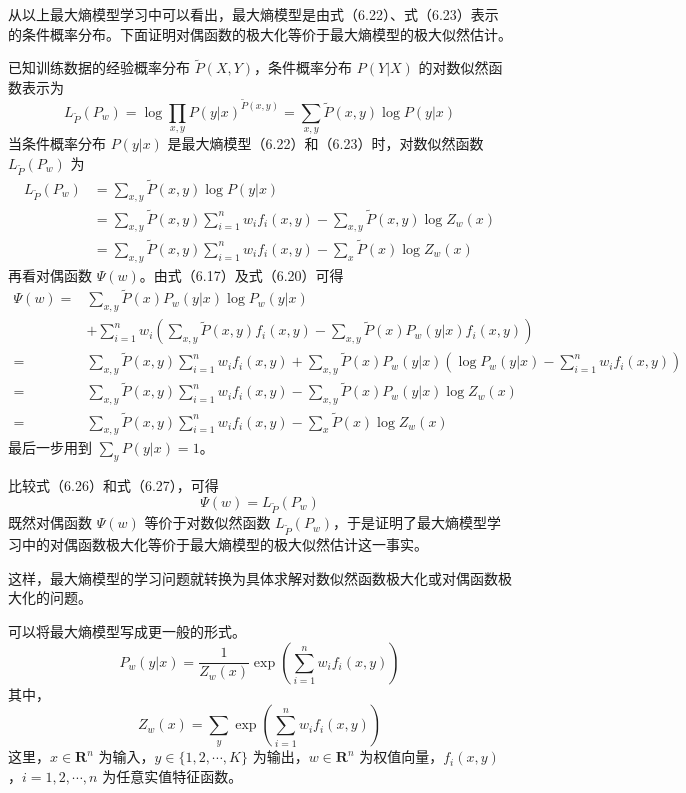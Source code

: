 \documentclass[UTF8,12pt,a4paper,fontset=fandol]{ctexart}
\begin{document}
从以上最大熵模型学习中可以看出，最大熵模型是由式（6.22）、式（6.23）表示的条件概率分布。下面证明对偶函数的极大化等价于最大熵模型的极大似然估计。

已知训练数据的经验概率分布 $\tilde{P}(X,Y)$，条件概率分布 $P(Y|X)$ 的对数似然函数表示为
\[
L_{\tilde{P}}(P_w)=\log\prod_{x,y}P(y|x)^{\tilde{P}(x,y)}
=\sum_{x,y}\tilde{P}(x,y)\log P(y|x)
\]
当条件概率分布 $P(y|x)$ 是最大熵模型（6.22）和（6.23）时，对数似然函数 $L_{\tilde{P}}(P_w)$ 为
\begin{equation}
\begin{aligned}
L_{\tilde{P}}(P_w)
&=\sum_{x,y}\tilde{P}(x,y)\log P(y|x)\\
&=\sum_{x,y}\tilde{P}(x,y)\sum_{i=1}^n w_i f_i(x,y)-\sum_{x,y}\tilde{P}(x,y)\log Z_w(x)\\
&=\sum_{x,y}\tilde{P}(x,y)\sum_{i=1}^n w_i f_i(x,y)-\sum_x\tilde{P}(x)\log Z_w(x)
\end{aligned}
\tag{6.26}
\end{equation}
再看对偶函数 $\Psi(w)$。由式（6.17）及式（6.20）可得
\begin{equation}
\begin{aligned}
\Psi(w)
={}&\sum_{x,y}\tilde{P}(x)P_w(y|x)\log P_w(y|x)\\
&+\sum_{i=1}^n w_i\left(\sum_{x,y}\tilde{P}(x,y)f_i(x,y)-\sum_{x,y}\tilde{P}(x)P_w(y|x)f_i(x,y)\right)\\
={}&\sum_{x,y}\tilde{P}(x,y)\sum_{i=1}^n w_i f_i(x,y)
+\sum_{x,y}\tilde{P}(x)P_w(y|x)\left(\log P_w(y|x)-\sum_{i=1}^n w_i f_i(x,y)\right)\\
={}&\sum_{x,y}\tilde{P}(x,y)\sum_{i=1}^n w_i f_i(x,y)-\sum_{x,y}\tilde{P}(x)P_w(y|x)\log Z_w(x)\\
={}&\sum_{x,y}\tilde{P}(x,y)\sum_{i=1}^n w_i f_i(x,y)-\sum_x\tilde{P}(x)\log Z_w(x)
\end{aligned}
\tag{6.27}
\end{equation}
最后一步用到 $\sum_y P(y|x)=1$。

比较式（6.26）和式（6.27），可得
\[
\Psi(w)=L_{\tilde{P}}(P_w)
\]
既然对偶函数 $\Psi(w)$ 等价于对数似然函数 $L_{\tilde{P}}(P_w)$，于是证明了最大熵模型学习中的对偶函数极大化等价于最大熵模型的极大似然估计这一事实。

这样，最大熵模型的学习问题就转换为具体求解对数似然函数极大化或对偶函数极大化的问题。

可以将最大熵模型写成更一般的形式。
\begin{equation}
P_w(y|x)=\frac{1}{Z_w(x)}\exp\left(\sum_{i=1}^n w_i f_i(x,y)\right)
\tag{6.28}
\end{equation}
其中，
\begin{equation}
Z_w(x)=\sum_y\exp\left(\sum_{i=1}^n w_i f_i(x,y)\right)
\tag{6.29}
\end{equation}
这里，$x\in\mathbf{R}^n$ 为输入，$y\in\{1,2,\cdots,K\}$ 为输出，$w\in\mathbf{R}^n$ 为权值向量，$f_i(x,y)$，$i=1,2,\cdots,n$ 为任意实值特征函数。
\end{document}
